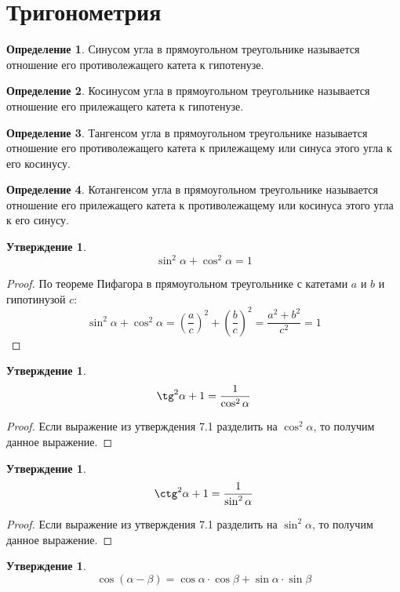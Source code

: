 \documentclass[12pt]{article}
\theoremstyle{definition}
\newtheorem{definition}{Определение}
\newtheorem{statement}[theorem]{Утверждение}
\begin{document}
\section{Тригонометрия}
\begin{definition}
    Синусом угла в прямоугольном треугольнике называется отношение его противолежащего катета к гипотенузе.
\end{definition}
\begin{definition}
    Косинусом угла в прямоугольном треугольнике называется отношение его прилежащего катета к гипотенузе.
\end{definition}
\begin{definition}
    Тангенсом угла в прямоугольном треугольнике называется отношение его противолежащего катета к прилежащему или синуса этого угла к его косинусу.
\end{definition}
\begin{definition}
    Котангенсом угла в прямоугольном треугольнике называется отношение его прилежащего катета к противолежащему или косинуса этого угла к его синусу.
\end{definition}
\begin{statement}
    $$\sin^2 \alpha + \cos^2 \alpha=1$$
\end{statement}
\begin{proof}
    По теореме Пифагора в прямоугольном треугольнике с катетами $a$ и $b$ и гипотинузой $c$:
    $$\sin^2 \alpha + \cos^2 \alpha=\left(\dfrac{a}{c}\right)^2+\left(\dfrac{b}{c}\right)^2=\dfrac{a^2 + b^2}{c^2}=1$$
\end{proof}
\begin{statement}
    $$\tg^2\alpha + 1=\dfrac{1}{\cos^2 \alpha}$$
\end{statement}
\begin{proof}
    Если выражение из утверждения 7.1 разделить на $\cos^2 \alpha$, то получим данное выражение.
\end{proof}
\begin{statement}
    $$\ctg^2\alpha + 1=\dfrac{1}{\sin^2 \alpha}$$
\end{statement}
\begin{proof}
    Если выражение из утверждения 7.1 разделить на $\sin^2 \alpha$, то получим данное выражение.
\end{proof}
\begin{statement}
    $$\cos(\alpha - \beta)=\cos\alpha\cdot\cos\beta+\sin\alpha\cdot\sin\beta$$
\end{statement}
\end{document}
